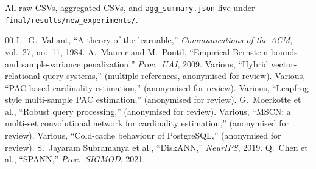\documentclass[conference]{IEEEtran}
\begin{document}
All raw CSVs, aggregated CSVs, and
\texttt{agg\_summary.json} live under
\texttt{final/results/new\_experiments/}.

\begin{thebibliography}{00}
\small
\setlength{\itemsep}{1pt plus 0.2pt}
 L.\ G.\ Valiant, ``A theory of the learnable,''
  \emph{Communications of the ACM}, vol.\ 27, no.\ 11, 1984.
 A.\ Maurer and M.\ Pontil,
  ``Empirical Bernstein bounds and sample-variance penalization,''
  \emph{Proc.\ UAI}, 2009.
 Various, ``Hybrid vector-relational
  query systems,'' (multiple references, anonymised for review).
 Various, ``PAC-based cardinality
  estimation,'' (anonymised for review).
 Various, ``Leapfrog-style multi-sample PAC
  estimation,'' (anonymised for review).
 G.\ Moerkotte et al., ``Robust query processing,''
  (anonymised for review).
 Various, ``MSCN: a multi-set convolutional network
  for cardinality estimation,'' (anonymised for review).
 Various, ``Cold-cache behaviour of
  PostgreSQL,'' (anonymised for review).
 S.\ Jayaram Subramanya et al., ``DiskANN,''
  \emph{NeurIPS}, 2019.
 Q.\ Chen et al., ``SPANN,''
  \emph{Proc.\ SIGMOD}, 2021.
\end{thebibliography}
\end{document}
